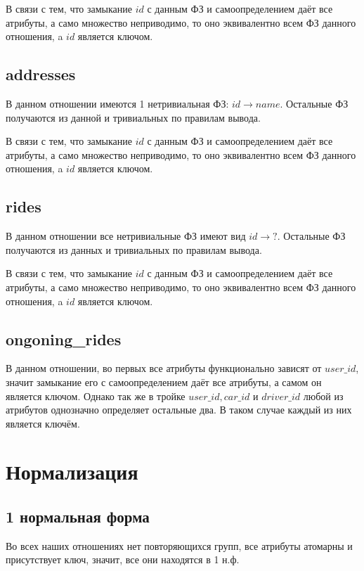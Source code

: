 \documentclass[fontsize=12pt]{article}
\begin{document}
В связи с тем, что замыкание $id$ с данным ФЗ и самоопределением даёт все атрибуты, а само множество неприводимо, то оно эквивалентно всем ФЗ данного отношения, a $id$ является ключом.

\subsection{addresses}

В данном отношении имеются 1 нетривиальная ФЗ: $id \rightarrow name$. Остальные ФЗ получаются из данной и тривиальных по правилам вывода. 

В связи с тем, что замыкание $id$ с данным ФЗ и самоопределением даёт все атрибуты, а само множество неприводимо, то оно эквивалентно всем ФЗ данного отношения, a $id$ является ключом.

\subsection{rides}

В данном отношении все нетривиальные ФЗ имеют вид $id \rightarrow ?$. Остальные ФЗ получаются из данных и тривиальных по правилам вывода. 

В связи с тем, что замыкание $id$ с данным ФЗ и самоопределением даёт все атрибуты, а само множество неприводимо, то оно эквивалентно всем ФЗ данного отношения, a $id$ является ключом.

\subsection{ongoning\_rides}

В данном отношении, во первых все атрибуты функционально зависят от $user\_id$, значит замыкание его с самоопределением  даёт все атрибуты, а самом он является ключом. Однако так же в тройке $user\_id, car\_id$ и $driver\_id$ любой из атрибутов однозначно определяет остальные два. В таком случае каждый из них является ключём. 

\section{Нормализация}

\subsection*{1 нормальная форма}

Во всех наших отношениях нет повторяющихся групп, все атрибуты атомарны и присутствует ключ, значит, все они находятся в 1 н.ф.
\end{document}

